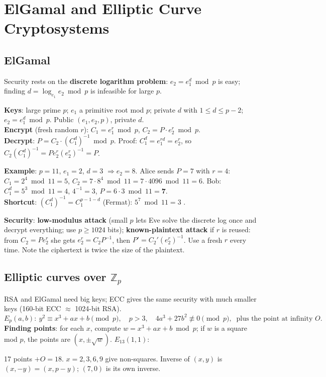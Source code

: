 \section{ElGamal and Elliptic Curve Cryptosystems}

\subsection{ElGamal}
Security rests on the \textbf{discrete logarithm problem}: $e_2 = e_1^d \bmod p$ is easy; finding $d = \log_{e_1} e_2 \bmod p$ is infeasible for large $p$.
\begin{keybox}[title=ElGamal]
\textbf{Keys}: large prime $p$; $e_1$ a primitive root mod $p$; private $d$ with $1 \le d \le p - 2$; \;$e_2 = e_1^d \bmod p$. Public $(e_1, e_2, p)$, private $d$.\\
\textbf{Encrypt} (fresh random $r$): $C_1 = e_1^r \bmod p$, \;$C_2 = P \cdot e_2^r \bmod p$.\\
\textbf{Decrypt}: $P = C_2 \cdot (C_1^d)^{-1} \bmod p$. \;Proof: $C_1^d = e_1^{rd} = e_2^r$, so $C_2 (C_1^d)^{-1} = P e_2^r (e_2^r)^{-1} = P$.
\end{keybox}
\textbf{Example}: $p = 11$, $e_1 = 2$, $d = 3$ $\Rightarrow e_2 = 8$. Alice sends $P = 7$ with $r = 4$: $C_1 = 2^4 \bmod 11 = 5$, \;$C_2 = 7 \cdot 8^4 \bmod 11 = 7 \cdot 4096 \bmod 11 = 6$. Bob: $C_1^d = 5^3 \bmod 11 = 4$, $4^{-1} = 3$, $P = 6 \cdot 3 \bmod 11 = \mathbf{7}$.\\
\textbf{Shortcut}: $(C_1^d)^{-1} = C_1^{p-1-d}$ (Fermat): $5^{7} \bmod 11 = 3$ \checkmark.

\textbf{Security}: \textbf{low-modulus attack} (small $p$ lets Eve solve the discrete log once and decrypt everything; use $p \ge 1024$ bits); \textbf{known-plaintext attack} if $r$ is reused: from $C_2 = P e_2^r$ she gets $e_2^r = C_2 P^{-1}$, then $P' = C_2' (e_2^r)^{-1}$. Use a fresh $r$ every time. Note the ciphertext is twice the size of the plaintext.

\subsection{Elliptic curves over $\mathbb{Z}_p$}
RSA and ElGamal need big keys; ECC gives the same security with much smaller keys (160-bit ECC $\approx$ 1024-bit RSA).
\[
E_p(a, b):\ y^2 \equiv x^3 + ax + b \pmod p,\quad p > 3,\quad 4a^3 + 27b^2 \not\equiv 0 \pmod p,\ \text{ plus the point at infinity } O.
\]
\textbf{Finding points}: for each $x$, compute $w = x^3 + ax + b \bmod p$; if $w$ is a square mod $p$, the points are $(x, \pm\sqrt w)$. $E_{13}(1,1)$:
\begin{center}\small
{}
\end{center}
17 points $+ O = 18$. $x = 2, 3, 6, 9$ give non-squares. Inverse of $(x, y)$ is $(x, -y) = (x, p - y)$; $(7, 0)$ is its own inverse.

